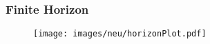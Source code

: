 \begin{frame}
\frametitle{Finite Horizon}
\begin{figure}
	\centering
	\texttt{[image: images/neu/horizonPlot.pdf]}
\end{figure}




\end{frame}
%